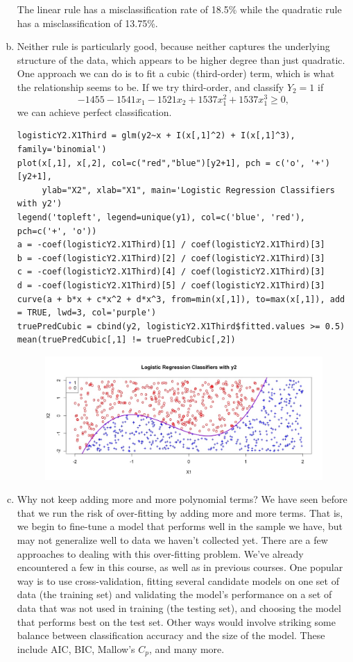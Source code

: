 \documentclass[12pt]{article}
\begin{document}
\begin{enumerate}[(a)]
\begin{figure}[H]
\end{figure}
The linear rule has a misclassification rate of 18.5\% while the quadratic rule has a misclassification of 13.75\%. 
\item Neither rule is particularly good, because neither captures the underlying structure of the data, which appears to be higher degree than just quadratic. One approach we can do is to fit a cubic (third-order) term, which is what the relationship seems to be. If we try third-order, and classify $Y_2 = 1$ if 
$$-1455 -1541 x_1 - 1521 x_2 + 1537 x_1^2 + 1537 x_1^3 \geq 0,$$ we can achieve perfect classification.
\begin{lstlisting}
logisticY2.X1Third = glm(y2~x + I(x[,1]^2) + I(x[,1]^3), family='binomial')
plot(x[,1], x[,2], col=c("red","blue")[y2+1], pch = c('o', '+')[y2+1], 
     ylab="X2", xlab="X1", main='Logistic Regression Classifiers with y2')
legend('topleft', legend=unique(y1), col=c('blue', 'red'), pch=c('+', 'o'))
a = -coef(logisticY2.X1Third)[1] / coef(logisticY2.X1Third)[3]
b = -coef(logisticY2.X1Third)[2] / coef(logisticY2.X1Third)[3]
c = -coef(logisticY2.X1Third)[4] / coef(logisticY2.X1Third)[3]
d = -coef(logisticY2.X1Third)[5] / coef(logisticY2.X1Third)[3]
curve(a + b*x + c*x^2 + d*x^3, from=min(x[,1]), to=max(x[,1]), add = TRUE, lwd=3, col='purple')
truePredCubic = cbind(y2, logisticY2.X1Third$fitted.values >= 0.5)
mean(truePredCubic[,1] != truePredCubic[,2])
\end{lstlisting}
\begin{figure}[H] \center
\includegraphics[scale=.4]{y2_plot2.jpeg}
\end{figure}
\item Why not keep adding more and more polynomial terms? We have seen before that we run the risk of over-fitting by adding more and more terms. That is, we begin to fine-tune a model that performs well in the sample we have, but may not generalize well to data we haven't collected yet. There are a few approaches to dealing with this over-fitting problem. We've already encountered a few in this course, as well as in previous courses. One popular way is to use cross-validation, fitting several candidate models on one set of data (the training set) and validating the model's performance on a set of data that was not used in training (the testing set), and choosing the model that performs best on the test set. Other ways would involve striking some balance between classification accuracy and the size of the model. These include AIC, BIC, Mallow's $C_p$, and many more.
\end{enumerate}
\end{document}
